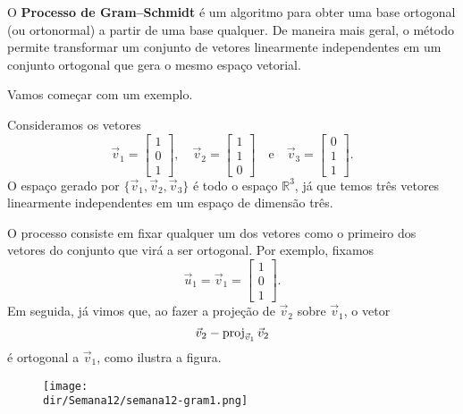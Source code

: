 \documentclass[../livro.tex]{subfiles}  %
\providecommand{\dir}{..}
\begin{document}
O \textbf{Processo de Gram--Schmidt} é um algoritmo para obter uma base ortogonal (ou ortonormal) a partir de uma base qualquer. De maneira mais geral, o método permite transformar um conjunto de vetores linearmente independentes em um conjunto ortogonal que gera o mesmo espaço vetorial. 

Vamos começar com um exemplo.

\begin{example}
Consideramos os vetores
\begin{equation}
\vec{v}_1 =
\begin{bmatrix}
1 \\ 0 \\ 1
\end{bmatrix}, \quad
\vec{v}_2 =
\begin{bmatrix}
1 \\ 1 \\ 0
\end{bmatrix} \quad \text{e} \quad
\vec{v}_3 =
\begin{bmatrix}
0 \\ 1 \\ 1
\end{bmatrix}.
\end{equation} O espaço gerado por $\{\vec{v}_1, \vec{v}_2, \vec{v}_3 \}$ é todo o espaço $\mathbb{R}^3$, já que temos três vetores  linearmente independentes em um espaço de dimensão três.

O processo consiste em fixar qualquer um dos vetores como o primeiro dos vetores do conjunto que virá a ser ortogonal. Por exemplo, fixamos
\begin{equation}
\vec{u}_1 = \vec{v}_1 =
\begin{bmatrix}
1 \\ 0 \\ 1
\end{bmatrix}.
\end{equation} Em seguida, já vimos que, ao fazer a projeção de $\vec{v}_2$ sobre $\vec{v}_1$, o vetor
\begin{equation}
\vec{v}_2 - \operatorname{proj}_{\vec{v}_1} \vec{v}_2
\end{equation} é ortogonal a $\vec{v}_1$, como ilustra a figura.
\begin{figure}[h!]
\begin{center}
\texttt{[image: \\dir/Semana12/semana12-gram1.png]}
\end{center}
\end{figure}


\end{example}
\end{document}
